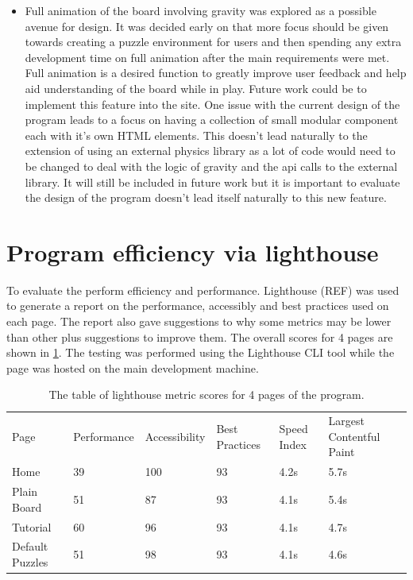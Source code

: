 \documentclass{l4proj}
\begin{document}
\begin{itemize}
    \item Full animation of the board involving gravity was explored as a possible avenue for design. It was decided early on that more focus should be given towards creating a puzzle environment for users and then spending any extra development time on full animation after the main requirements were met. Full animation is a desired function to greatly improve user feedback and help aid understanding of the board while in play. Future work could be to implement this feature into the site. One issue with the current design of the program leads to a focus on having a collection of small modular component each with it's own HTML elements. This doesn't lead naturally to the extension of using an external physics library as a lot of code would need to be changed to deal with the logic of gravity and the api calls to the external library. It will still be included in future work but it is important to evaluate the design of the program doesn't lead itself naturally to this new feature.   
\end{itemize}

\section{Program efficiency via lighthouse}
To evaluate the perform efficiency and performance. Lighthouse (REF) was used to generate a report on the performance, accessibly and best practices used on each page. The report also gave suggestions to why some metrics may be lower than other plus suggestions to improve them. The overall scores for 4 pages are shown in \ref{tab:lighthouse}. The testing was performed using the Lighthouse CLI tool while the page was hosted on the main development machine. 

\begin{table}[]
    \caption{The table of lighthouse metric scores for 4 pages of the program.}\label{tab:lighthouse}
    \begin{tabular}{llllll}
    Page            & Performance & Accessibility & Best Practices & Speed Index & Largest Contentful Paint \\
    Home            & 39          & 100           & 93             & 4.2s        & 5.7s                     \\
    Plain Board     & 51          & 87            & 93             & 4.1s        & 5.4s                     \\
    Tutorial        & 60          & 96            & 93             & 4.1s        & 4.7s                     \\
    Default Puzzles & 51          & 98            & 93             & 4.1s        & 4.6s                    
    \end{tabular}
    \end{table}
\end{document}
